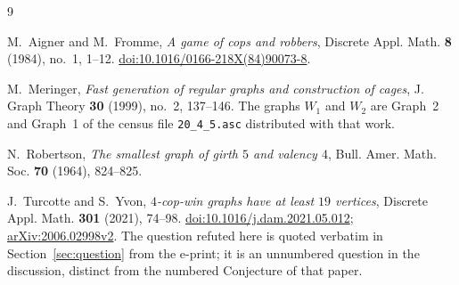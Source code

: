 \documentclass[11pt]{amsart}
\theoremstyle{remark}
\begin{document}
\begin{thebibliography}{9}

M.~Aigner and M.~Fromme,
\emph{A game of cops and robbers},
Discrete Appl. Math. \textbf{8} (1984), no.~1, 1--12.
\href{https://doi.org/10.1016/0166-218X(84)90073-8}{doi:10.1016/0166-218X(84)90073-8}.

M.~Meringer,
\emph{Fast generation of regular graphs and construction of cages},
J. Graph Theory \textbf{30} (1999), no.~2, 137--146.
The graphs $W_1$ and $W_2$ are Graph~2 and Graph~1 of the census file
\texttt{20\_4\_5.asc} distributed with that work.

N.~Robertson,
\emph{The smallest graph of girth $5$ and valency $4$},
Bull. Amer. Math. Soc. \textbf{70} (1964), 824--825.

J.~Turcotte and S.~Yvon,
\emph{$4$-cop-win graphs have at least $19$ vertices},
Discrete Appl. Math. \textbf{301} (2021), 74--98.
\href{https://doi.org/10.1016/j.dam.2021.05.012}{doi:10.1016/j.dam.2021.05.012};
\href{https://arxiv.org/abs/2006.02998v2}{arXiv:2006.02998v2}. The question refuted here is
quoted verbatim in Section~\ref{sec:question} from the e-print; it is an unnumbered question in
the discussion, distinct from the numbered Conjecture of that paper.

\end{thebibliography}
\end{document}
